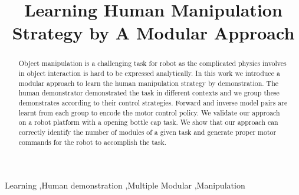 \documentclass[preprint,12pt]{elsarticle}
\begin{document}
\begin{frontmatter}



\title{Learning Human Manipulation Strategy by A Modular Approach}


\author{}

\address{}
\begin{abstract}
Object manipulation is a challenging task for robot as the complicated physics involves in object interaction is hard to be expressed analytically. In this work we introduce a modular approach to learn the human manipulation strategy by demonstration. The human demonstrator demonstrated the task in different contexts and we group these demonstrates according to their control strategies. Forward and inverse model pairs are learnt from each group to encode the motor control policy. We validate our approach on a robot platform with a opening bottle cap task. We show that our approach can correctly identify the number of modules of a given task and generate proper motor commands for the robot to accomplish the task.
\end{abstract}

\begin{keyword}
Learning \sep Human demonstration \sep Multiple Modular \sep Manipulation



\end{keyword}

\end{frontmatter}
\end{document}
